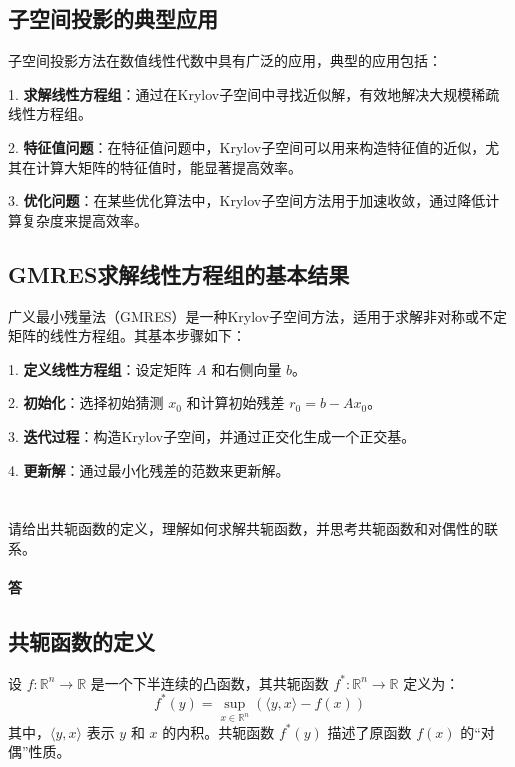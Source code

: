 \documentclass[a4paper]{article}
\begin{document}
\subsection{子空间投影的典型应用}

子空间投影方法在数值线性代数中具有广泛的应用，典型的应用包括：

1. \textbf{求解线性方程组}：通过在Krylov子空间中寻找近似解，有效地解决大规模稀疏线性方程组。

2. \textbf{特征值问题}：在特征值问题中，Krylov子空间可以用来构造特征值的近似，尤其在计算大矩阵的特征值时，能显著提高效率。

3. \textbf{优化问题}：在某些优化算法中，Krylov子空间方法用于加速收敛，通过降低计算复杂度来提高效率。

\subsection{GMRES求解线性方程组的基本结果}

广义最小残量法（GMRES）是一种Krylov子空间方法，适用于求解非对称或不定矩阵的线性方程组。其基本步骤如下：

1. \textbf{定义线性方程组}：设定矩阵 $A$ 和右侧向量 $b$。

2. \textbf{初始化}：选择初始猜测 $x_0$ 和计算初始残差 $r_0 = b - Ax_0$。

3. \textbf{迭代过程}：构造Krylov子空间，并通过正交化生成一个正交基。

4. \textbf{更新解}：通过最小化残差的范数来更新解。


\section{}

请给出共轭函数的定义，理解如何求解共轭函数，并思考共轭函数和对偶性的联系。

\paragraph{答}

\subsection{共轭函数的定义}

设 $f: \mathbb{R}^n \to \mathbb{R}$ 是一个下半连续的凸函数，其共轭函数 $f^*: \mathbb{R}^n \to \mathbb{R}$ 定义为：
\[
f^*(y) = \sup_{x \in \mathbb{R}^n} \left( \langle y, x \rangle - f(x) \right)
\]
其中，$\langle y, x \rangle$ 表示 $y$ 和 $x$ 的内积。共轭函数 $f^*(y)$ 描述了原函数 $f(x)$ 的“对偶”性质。
\end{document}
